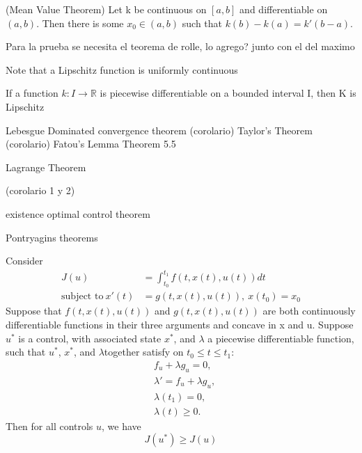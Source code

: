\begin{theorem}(Mean Value Theorem)
	Let k be continuous on $[a,b]$ and differentiable on $(a,b)$. Then there is
    some $x_0 \in (a,b)$ such that $k(b) - k(a) = k'(b - a)$.
\end{theorem}
Para la prueba se necesita el teorema de rolle, lo agrego? junto con el del maximo

Note that a Lipschitz function is uniformly continuous

\begin{theorem}
	If a function $k : I \rightarrow \mathbb{R}$ is piecewise differentiable on
    a bounded interval I, then K is Lipschitz
\end{theorem}


Lebesgue Dominated convergence theorem
(corolario)
Taylor's Theorem
(corolario)
Fatou's Lemma
Theorem 5.5

Lagrange Theorem

(corolario 1 y 2)


existence optimal control theorem


Pontryagins theorems


\begin{theorem}
	Consider
    \begin{align*}
    	J(u) &= \int_{t_0}^{t_1} f(t,x(t),u(t))dt \\
        \text{subject to} \ x'(t) &= g(t,x(t),u(t)), \ x(t_0) = x_0 
    \end{align*}
    Suppose that $f(t,x(t),u(t))$ and $g(t,x(t),u(t))$ are both continuously 
    differentiable functions in their three arguments and concave in x and u. 
    Suppose $u^{*}$ is a control, with associated state $x^{*}$, and $\lambda$
    a piecewise differentiable function, such that $u^{*}$, $x^{*}$, and 
    $\lambda$together satisfy on $t_0 \leq t \leq t_1$:
    \begin{align*}
    	& f_{u} + \lambda g_{u} = 0, \\
        & \lambda ' = f_{u} + \lambda g_{u}, \\
        & \lambda (t_1) = 0, \\
        & \lambda (t) \geq 0.
    \end{align*}
    Then for all controls $u$, we have
    $$
    	J(u^{*}) \geq J(u)
    $$
\end{theorem}

